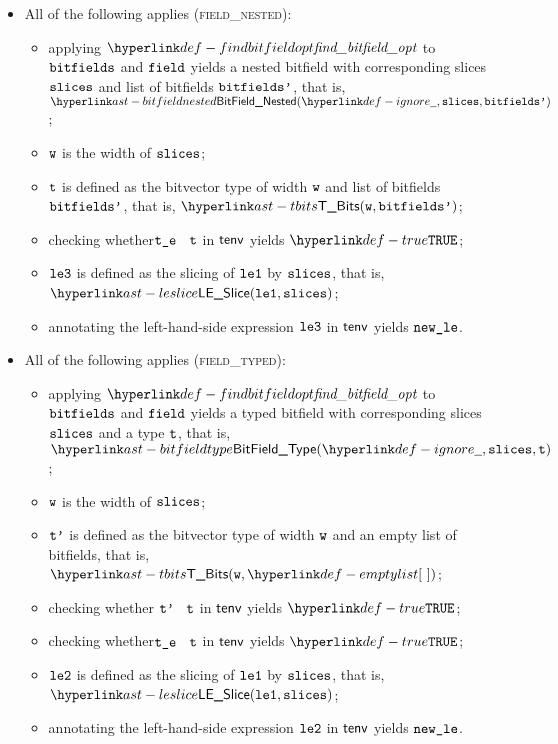 \begin{itemize}
\begin{itemize}
    \item All of the following applies (\textsc{field\_nested}):
    \begin{itemize}
      \item applying $\findbitfieldopt$ to $\texttt{bitfields}$ and $\texttt{field}$ yields a nested bitfield with corresponding
            slices $\texttt{slices}$ and list of bitfields $\texttt{bitfields'}$, that is, \\ $\BitFieldNested(\Ignore, \slices, \bitfieldsp)$;
      \item $\texttt{w}$ is the width of $\texttt{slices}$;
      \item $\texttt{t}$ is defined as the bitvector type of width $\texttt{w}$ and list of bitfields $\texttt{bitfields'}$, that is, $\TBits(\vw, \bitfieldsp)$;
      \item checking whether$\texttt{t\_e}$ \typesatisfies\ $\texttt{t}$ in $\textsf{tenv}$ yields $\True$\ProseOrTypeError;
      \item $\texttt{le3}$ is defined as the slicing of $\texttt{le1}$ by $\texttt{slices}$, that is, \\ $\LESlice(\vleone, \slices)$;
      \item annotating the left-hand-side expression $\texttt{le3}$ in $\textsf{tenv}$ yields $\texttt{new\_le}$\ProseOrTypeError.
    \end{itemize}

    \item All of the following applies (\textsc{field\_typed}):
    \begin{itemize}
      \item applying $\findbitfieldopt$ to $\texttt{bitfields}$ and $\texttt{field}$ yields a typed bitfield with corresponding
            slices $\texttt{slices}$ and a type $\texttt{t}$, that is, \\ $\BitFieldType(\Ignore, \vslices, \vt)$;
      \item $\texttt{w}$ is the width of $\texttt{slices}$;
      \item $\texttt{t'}$ is defined as the bitvector type of width $\texttt{w}$ and an empty list of bitfields, that is, $\TBits(\vw , \emptylist)$;
      \item checking whether $\texttt{t'}$ \typesatisfies\ $\texttt{t}$ in $\textsf{tenv}$ yields $\True$\ProseOrTypeError;
      \item checking whether$\texttt{t\_e}$ \typesatisfies\ $\texttt{t}$ in $\textsf{tenv}$ yields $\True$\ProseOrTypeError;
      \item $\texttt{le2}$ is defined as the slicing of $\texttt{le1}$ by $\texttt{slices}$, that is, \\ $\LESlice(\vleone, \slices)$;
      \item annotating the left-hand-side expression $\texttt{le2}$ in $\textsf{tenv}$ yields $\texttt{new\_le}$\ProseOrTypeError.
    \end{itemize}
  \end{itemize}
\end{itemize}
